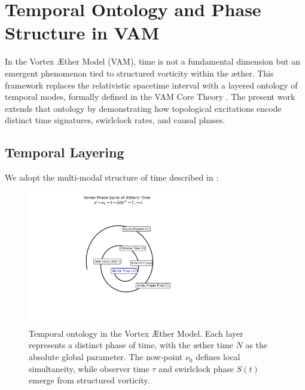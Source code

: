 \section{Temporal Ontology and Phase Structure in VAM}

In the Vortex \AE ther Model (VAM), time is not a fundamental dimension but an emergent phenomenon tied to structured vorticity within the æther. This framework replaces the relativistic spacetime interval with a layered ontology of temporal modes, formally defined in the VAM Core Theory \cite{iskandarani2025vam2}. The present work extends that ontology by demonstrating how topological excitations encode distinct time signatures, swirlclock rates, and causal phases.

\subsection*{Temporal Layering}

We adopt the multi-modal structure of time described in \cite{iskandarani2025vam2}:
\begin{figure}[H]
    \centering
    \includegraphics[width=0.7\textwidth]{images/TemporalOntologyv2}
    \caption{Temporal ontology in the Vortex Æther Model. Each layer represents a distinct phase of time, with the æther time $N$ as the absolute global parameter. The now-point $\nu_0$ defines local simultaneity, while observer time $\tau$ and swirlclock phase $S(t)$ emerge from structured vorticity.}
\end{figure}

